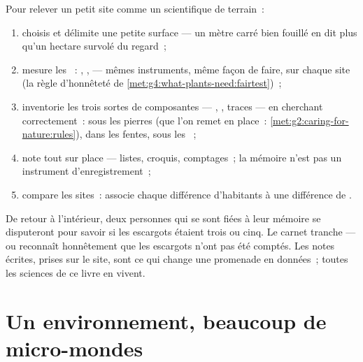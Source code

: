 \begin{method}\label{met:g6:exploring-our-environment:survey}
Pour relever un petit site comme un scientifique de terrain~:
\begin{enumerate}
  \item choisis et délimite une petite surface --- un mètre carré
        bien fouillé en dit plus qu'un hectare survolé du regard~;
  \item mesure les ~: , ,  ---
        mêmes instruments, même façon de faire, sur chaque site
        (la règle d'honnêteté de
        \cref{met:g4:what-plants-need:fairtest})~;
  \item inventorie les trois sortes de composantes --- , , traces --- en cherchant
        correctement~: sous les pierres (que l'on remet en place~:
        \cref{met:g2:caring-for-nature:rules}), dans les fentes,
        sous les ~;
  \item note tout sur place --- listes, croquis, comptages~; la
        mémoire n'est pas un instrument d'enregistrement~;
  \item compare les sites~: associe chaque différence d'habitants à
        une différence de .
\end{enumerate}
\end{method}

\begin{remark}\label{rem:g6:exploring-our-environment:records}
De retour à l'intérieur, deux personnes qui se sont fiées à leur
mémoire se disputeront pour savoir si les escargots étaient trois ou
cinq. Le carnet tranche --- ou reconnaît honnêtement que les
escargots n'ont pas été comptés. Les notes écrites, prises sur le
site, sont ce qui change une promenade en données~; toutes les
sciences de ce livre en vivent.
\end{remark}

\section{Un environnement, beaucoup de micro-mondes}

